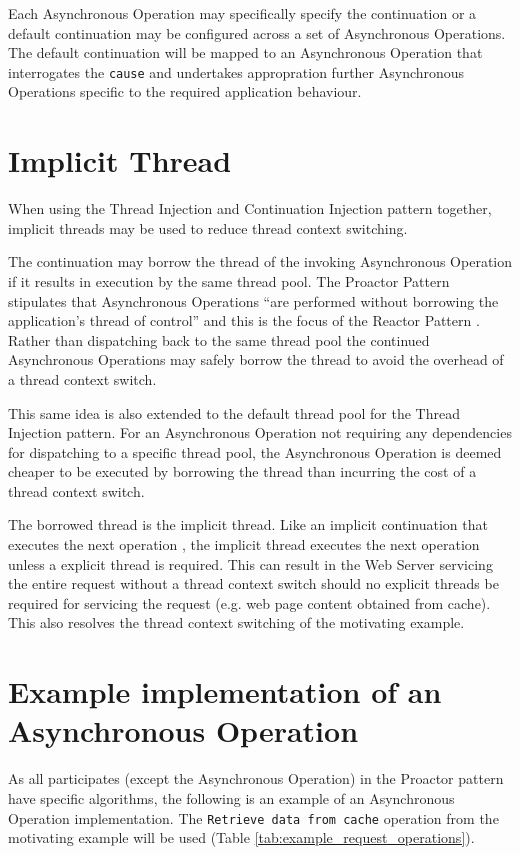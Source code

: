\documentclass{article}
\begin{document}
Each Asynchronous Operation may specifically specify the continuation or a
default continuation may be configured across a set of Asynchronous Operations. 
The default continuation will be mapped to an Asynchronous Operation that
interrogates the \texttt{cause} and undertakes appropration further Asynchronous
Operations specific to the required application behaviour.


\section{Implicit Thread}

When using the Thread Injection and Continuation Injection pattern together,
implicit threads may be used to reduce thread context switching.

The continuation may borrow the thread of the invoking Asynchronous Operation if
it results in execution by the same thread pool.  The Proactor Pattern
stipulates that Asynchronous Operations ``are performed without borrowing the
application's thread of control'' \cite{proactor} and this is the focus of the
Reactor Pattern \cite{reactor}.  Rather than dispatching back to the same thread
pool the continued Asynchronous Operations may safely borrow the thread to avoid
the overhead of a thread context switch.

This same idea is also extended to the default thread pool for the Thread
Injection pattern.  For an Asynchronous Operation not requiring any dependencies
for dispatching to a specific thread pool, the Asynchronous Operation is deemed
cheaper to be executed by borrowing the thread than incurring the cost of a
thread context switch.

The borrowed thread is the implicit thread.  Like an implicit continuation that
executes the next operation \cite{continuations}, the implicit thread executes
the next operation unless a explicit thread is required.  This can result in the
Web Server servicing the entire request without a thread context switch should
no explicit threads be required for servicing the request (e.g. web page content
obtained from cache).  This also resolves the thread context switching of the
motivating example.


\section{Example implementation of an Asynchronous Operation}

As all participates (except the Asynchronous Operation) in the Proactor pattern
have specific algorithms, the following is an example of an Asynchronous
Operation implementation.  The \texttt{Retrieve data from cache} operation from
the motivating example will be used (Table
\ref{tab:example_request_operations}).
\end{document}
